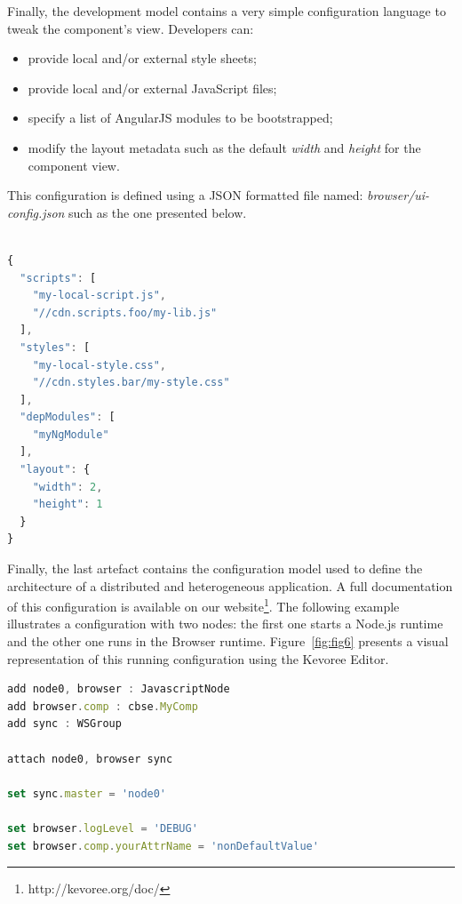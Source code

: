Finally, the development model contains a very simple configuration language to tweak the component's view. Developers can:

\begin{itemize}
	\item provide local and/or external style sheets;
	\item provide local and/or external JavaScript files;
	\item specify a list of AngularJS modules to be bootstrapped;
	\item modify the layout metadata such as the default \emph{width} and \emph{height} for the component view.
\end{itemize}


This configuration is defined using a JSON formatted file named: \emph{browser/ui-config.json} such as the one presented below.

\begin{lstlisting}[language=JavaScript,numbers=right,firstnumber=1,basicstyle=\scriptsize,deletekeywords={port},frame=none,caption={Excerpt of the component configuration}]

{
  "scripts": [
    "my-local-script.js",
    "//cdn.scripts.foo/my-lib.js"
  ],
  "styles": [
    "my-local-style.css",
    "//cdn.styles.bar/my-style.css"
  ],
  "depModules": [
    "myNgModule"
  ],
  "layout": {
    "width": 2,
    "height": 1
  }
}
\end{lstlisting}

Finally, the last artefact contains the configuration model used to define the architecture of a distributed and heterogeneous application. A full documentation of this configuration is available on our website\footnote{http://kevoree.org/doc/}. The following example  illustrates a configuration with two nodes: the first one starts a Node.js runtime  and the other one runs in the Browser runtime. Figure~\ref{fig:fig6} presents a visual representation of this running configuration using the Kevoree Editor.


\begin{lstlisting}[language=JavaScript,numbers=right,firstnumber=1,basicstyle=\scriptsize,morekeywords={add,attach,set,network},frame=none,caption={Excerpt of the application initial configuration}]
add node0, browser : JavascriptNode
add browser.comp : cbse.MyComp
add sync : WSGroup

attach node0, browser sync

set sync.master = 'node0'

set browser.logLevel = 'DEBUG'
set browser.comp.yourAttrName = 'nonDefaultValue'
\end{lstlisting}


